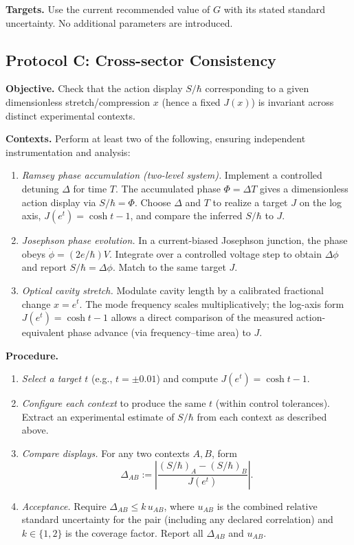 \documentclass[11pt]{article}
\begin{document}
\textbf{Targets.} Use the current recommended value of \(G\) with its stated standard uncertainty. No additional parameters are introduced.

\medskip

\subsection*{Protocol C: Cross-sector Consistency}
\textbf{Objective.} Check that the action display \(S/\hbar\) corresponding to a given dimensionless stretch/compression \(x\) (hence a fixed \(J(x)\)) is invariant across distinct experimental contexts.

\textbf{Contexts.} Perform at least two of the following, ensuring independent instrumentation and analysis:
\begin{enumerate}
  \item \emph{Ramsey phase accumulation (two-level system).} Implement a controlled detuning \(\Delta\) for time \(T\). The accumulated phase \(\Phi=\Delta T\) gives a dimensionless action display via \(S/\hbar=\Phi\). Choose \(\Delta\) and \(T\) to realize a target \(J\) on the log axis, \(J(e^{t})=\cosh t-1\), and compare the inferred \(S/\hbar\) to \(J\).
  \item \emph{Josephson phase evolution.} In a current-biased Josephson junction, the phase obeys \(\dot{\phi}=(2e/\hbar)V\). Integrate over a controlled voltage step to obtain \(\Delta\phi\) and report \(S/\hbar=\Delta\phi\). Match to the same target \(J\).
  \item \emph{Optical cavity stretch.} Modulate cavity length by a calibrated fractional change \(x=e^{t}\). The mode frequency scales multiplicatively; the log-axis form \(J(e^{t})=\cosh t-1\) allows a direct comparison of the measured action-equivalent phase advance (via frequency–time area) to \(J\).
\end{enumerate}

\textbf{Procedure.}
\begin{enumerate}
  \item \emph{Select a target \(t\)} (e.g., \(t=\pm 0.01\)) and compute \(J(e^{t})=\cosh t-1\).
  \item \emph{Configure each context} to produce the same \(t\) (within control tolerances). Extract an experimental estimate of \(S/\hbar\) from each context as described above.
  \item \emph{Compare displays.} For any two contexts \(A,B\), form
  \[
  \Delta_{AB}:=\left|\frac{(S/\hbar)_A-(S/\hbar)_B}{J(e^{t})}\right|.
  \]
  \item \emph{Acceptance.} Require \(\Delta_{AB}\le k\,u_{AB}\), where \(u_{AB}\) is the combined relative standard uncertainty for the pair (including any declared correlation) and \(k\in\{1,2\}\) is the coverage factor. Report all \(\Delta_{AB}\) and \(u_{AB}\).
\end{enumerate}
\end{document}
